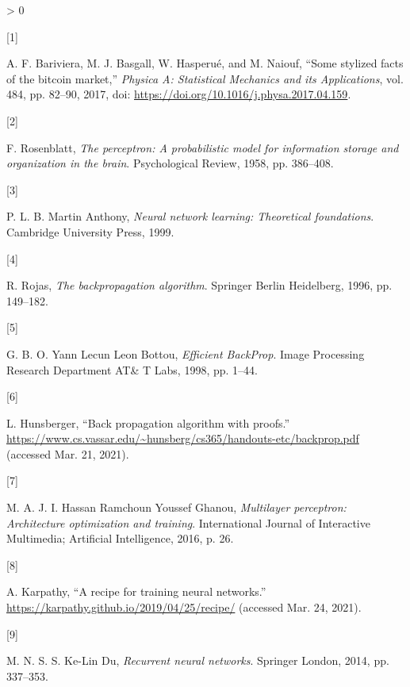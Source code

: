 \documentclass[
]{article}
\newlength{\cslhangindent}
\newlength{\csllabelwidth}
\newenvironment{CSLReferences}[2] %
 {%
  \setlength{\parindent}{0pt}
  \ifodd #1 \everypar{\setlength{\hangindent}{\cslhangindent}}\ignorespaces\fi
  \ifnum #2 > 0
  \setlength{\parskip}{#2\baselineskip}
  \fi
 }%
 {}
\newcommand{\CSLLeftMargin}[1]{\parbox[t]{\csllabelwidth}{#1}}
\newcommand{\CSLRightInline}[1]{\parbox[t]{\linewidth - \csllabelwidth}{#1}\break}
\begin{document}
\hypertarget{refs}{}
\begin{CSLReferences}{0}{0}
\leavevmode\hypertarget{ref-bitcoin_market}{}%
\CSLLeftMargin{{[}1{]} }
\CSLRightInline{A. F. Bariviera, M. J. Basgall, W. Hasperué, and M.
Naiouf, {``Some stylized facts of the bitcoin market,''} \emph{Physica
A: Statistical Mechanics and its Applications}, vol. 484, pp. 82--90,
2017, doi: \url{https://doi.org/10.1016/j.physa.2017.04.159}.}

\leavevmode\hypertarget{ref-perceptron_paper}{}%
\CSLLeftMargin{{[}2{]} }
\CSLRightInline{F. Rosenblatt, \emph{The perceptron: A probabilistic
model for information storage and organization in the brain}.
Psychological Review, 1958, pp. 386--408.}

\leavevmode\hypertarget{ref-nn_learning_theoretical_foundations}{}%
\CSLLeftMargin{{[}3{]} }
\CSLRightInline{P. L. B. Martin Anthony, \emph{Neural network learning:
Theoretical foundations}. Cambridge University Press, 1999.}

\leavevmode\hypertarget{ref-backpropagation}{}%
\CSLLeftMargin{{[}4{]} }
\CSLRightInline{R. Rojas, \emph{The backpropagation algorithm}. Springer
Berlin Heidelberg, 1996, pp. 149--182.}

\leavevmode\hypertarget{ref-efficient_backprop}{}%
\CSLLeftMargin{{[}5{]} }
\CSLRightInline{G. B. O. Yann Lecun Leon Bottou, \emph{Efficient
BackProp}. Image Processing Research Department AT\& T Labs, 1998, pp.
1--44.}

\leavevmode\hypertarget{ref-backpropagation_proofs}{}%
\CSLLeftMargin{{[}6{]} }
\CSLRightInline{L. Hunsberger, {``Back propagation algorithm with
proofs.''}
\url{https://www.cs.vassar.edu/~hunsberg/cs365/handouts-etc/backprop.pdf}
(accessed Mar. 21, 2021).}

\leavevmode\hypertarget{ref-mlp_architecture}{}%
\CSLLeftMargin{{[}7{]} }
\CSLRightInline{M. A. J. I. Hassan Ramchoun Youssef Ghanou,
\emph{Multilayer perceptron: Architecture optimization and training}.
International Journal of Interactive Multimedia; Artificial
Intelligence, 2016, p. 26.}

\leavevmode\hypertarget{ref-recipe_training}{}%
\CSLLeftMargin{{[}8{]} }
\CSLRightInline{A. Karpathy, {``A recipe for training neural
networks.''} \url{https://karpathy.github.io/2019/04/25/recipe/}
(accessed Mar. 24, 2021).}

\leavevmode\hypertarget{ref-RNN}{}%
\CSLLeftMargin{{[}9{]} }
\CSLRightInline{M. N. S. S. Ke-Lin Du, \emph{Recurrent neural networks}.
Springer London, 2014, pp. 337--353.}


\end{CSLReferences}
\end{document}
